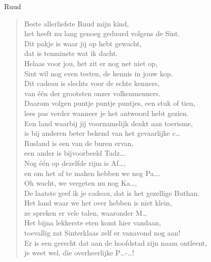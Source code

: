 \documentclass[12pt]{brief}
\date{11 december 2005}
\begin{document}
\begin{letter}{Ruud}

\opening{}


\begin{verse}

Beste allerliefste Ruud mijn kind,\\
het heeft nu lang genoeg geduurd volgens de Sint.\\
Dit pakje is waar jij op hebt gewacht,\\
dat is tenminste wat ik dacht.\\[0.5em]

Helaas voor jou, het zit er nog net niet op,\\
Sint wil nog even testen, de kennis in jouw kop.\\
Dit cadeau is slechts voor de echte kenners,\\
van \'e\'en der grootsten onzer volkenmenners.\\[0.5em]

Daarom volgen puntje puntje puntjes, een stuk of tien,\\
lees pas verder wanneer je het antwoord hebt gezien.\\[0.5em]

Een land waarbij jij voornamelijk denkt aan toerisme,\\
is bij anderen beter bekend van het gevaarlijke c\ldots\\
Rusland is een van de buren ervan,\\
een ander is bijvoorbeeld Tadz\ldots.\\
Nog \'e\'en op dezelfde rijm is Af\ldots,\\
en om het af te maken hebben we nog Pa\ldots.\\
Oh wacht, we vergeten nu nog Ka\ldots,\\
De laatste geef ik je cadeau, dat is het gezellige Buthan.\\[0.5em]

Het land waar we het over hebben is niet klein,\\
ze spreken er vele talen, waaronder M\ldots\\
Het bijna lekkerste eten komt hier vandaan,\\
toevallig zat Sinterklaas zelf er vanavond nog aan!\\
Er is een gerecht dat aan de hoofdstad zijn naam ontleent,\\
je weet wel, die overheerlijke P\ldots-\ldots!\\[0.5em]


\end{verse}
\end{letter}
\end{document}
